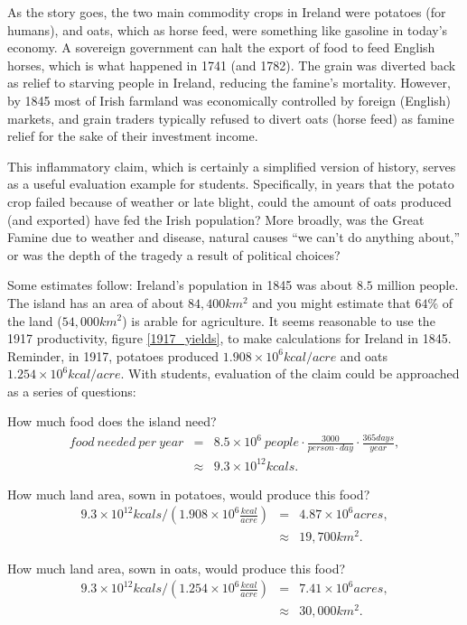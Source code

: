 \documentclass[prb,preprint]{revtex4-2}
\newcommand{\bea}{\begin{eqnarray}}
\newcommand{\eea}{\end{eqnarray}}
\begin{document}
As the story goes, the two main commodity crops in Ireland were potatoes (for humans), and oats, which as horse feed, were something like gasoline in today's economy.  A sovereign government can halt the export of food to feed English horses, which is what happened in 1741 (and 1782). The grain was diverted back as relief to starving people in Ireland, reducing the famine's mortality. However, by 1845 most of Irish farmland was economically controlled by foreign (English) markets, and grain traders typically refused to divert oats (horse feed) as famine relief for the sake of their investment income.

This inflammatory claim, which is certainly a simplified version of history, serves as a useful evaluation example for students. Specifically, in years that the potato crop failed because of weather or late blight, could the amount of oats produced (and exported) have fed the Irish population?  More broadly, was the Great Famine due to weather and disease, natural causes ``we can't do anything about,''  or was the depth of the tragedy a result of political choices?

Some estimates follow:  Ireland's population in 1845 was about $8.5$ million people.  The island has an area of about $84,400km^2$\cite{IRE_area} and you might estimate that $64\%$ of the land ($54,000km^2$) is arable for agriculture.\cite{arable_percentage}  
It seems reasonable to use the 1917 productivity,  figure \ref{1917_yields},  to make calculations for Ireland in 1845.  Reminder, in 1917, potatoes produced $1.908\times10^6 kcal/acre$ and oats $1.254\times10^6kcal/acre$.
With students, evaluation of the claim could be approached as a series of questions:

How much food does the island need?
\bea
food~needed~per~year &=& 8.5\times10^6~people
	\cdot \frac{3000}{person\cdot day }
	\cdot \frac{365days}{year} , \nonumber \\
&\approx& 9.3\times 10^{12} kcals . 
\eea       

How much land area, sown in potatoes, would produce this food?
\bea
9.3\times10^{12}kcals /\left(1.908\times 10^6\frac{kcal}{acre}\right) &=& 4.87\times10^6 acres , \nonumber\\
 &\approx& 19,700 km^2 . 
\eea

How much land area, sown in oats, would produce this food?
\bea
9.3\times10^{12}kcals /\left(1.254\times10^6\frac{kcal}{acre}\right) &=& 7.41 \times10^6 acres , \nonumber \\
 &\approx& 30,000 km^2 . 
\eea
\end{document}
